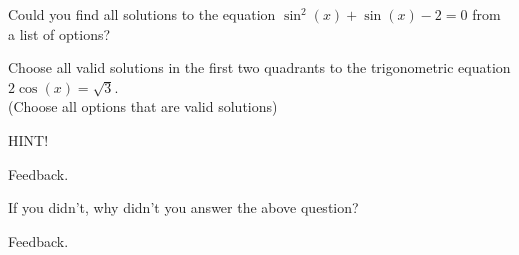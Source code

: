 \documentclass{ximera}
\begin{document}
\begin{question}

    Could you find all solutions to the equation $\sin^2(x) + \sin(x) -2 = 0$ from a list of options?
    
    \begin{multipleChoice}
    
    \end{multipleChoice}

\end{question}


\begin{problem} 

\begin{problem}
    Choose all valid solutions in the first two quadrants to the trigonometric equation $2\cos(x) = \sqrt{3}$. \\ (Choose all options that are valid solutions)
    
    \begin{hint}
    HINT!
    \end{hint}

  \begin{selectAll}
      \choice{$\pi$}
      
      \begin{feedback}[attempt]
      Feedback.
      \end{feedback}
      
  \end{selectAll}
  
\end{problem}

\begin{question}
  
  If you didn't, why didn't you answer the above question?
  
  \begin{multipleChoice}
      
      \begin{feedback}[attempt]
      Feedback.
      \end{feedback}
  \end{multipleChoice}
  
\end{question}
  
\end{problem}
\end{document}
